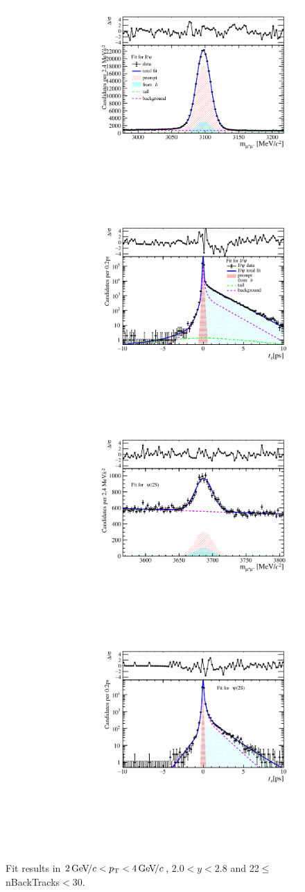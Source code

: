\begin{figure}[H]
\begin{center}
\includegraphics[width=0.47\linewidth]{pdf/Jpsi/drawmassB/n4y1pt2.pdf}
\includegraphics[width=0.47\linewidth]{pdf/Jpsi/2DFitB/n4y1pt2.pdf}
\vspace*{-0.5cm}
\includegraphics[width=0.47\linewidth]{pdf/Psi2S/drawmassB/n4y1pt2.pdf}
\includegraphics[width=0.47\linewidth]{pdf/Psi2S/2DFitB/n4y1pt2.pdf}
\vspace*{-0.5cm}
\end{center}
\caption{Fit results in $2\text{\,Ge\kern -0.1em V\!/}c<p_{\mathrm{T}}<4\text{\,Ge\kern -0.1em V\!/}c$, $2.0<y<2.8$ and 22$\leq$nBackTracks$<$30.}
\label{Fitn4y1pt2}
\end{figure}
